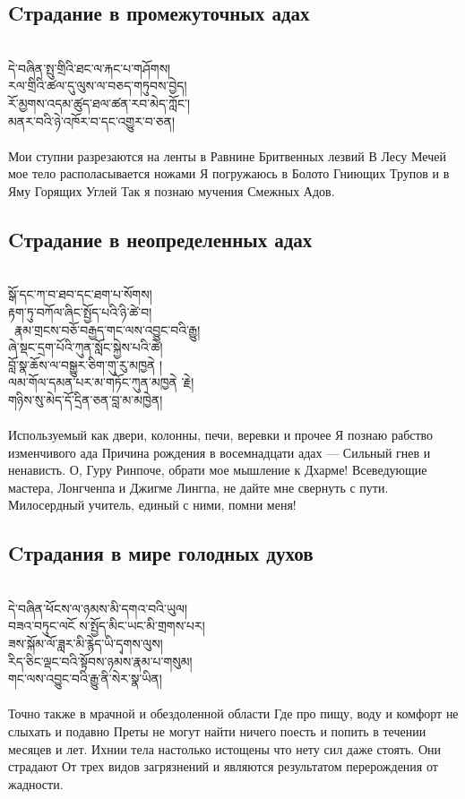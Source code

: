 \subsection*{Cтрадание в промежуточных адах}
\\
\ti
དེ་བཞིན་སྤུ་གྲིའི་ཐང་ལ་རྐང་པ་གཤོགས།\\
རལ་གྲིའི་ཚལ་དུ་ལུས་ལ་བཅད་གཏུབས་བྱེད།\\
རོ་མྱགས་འདམ་ཚུད་ཐལ་ཚན་རབ་མེད་ཀློང་། \\
མནར་བའི་ཉེ་འཁོར་བ་དང་འགྱུར་བ་ཅན།\\
\\
\ru
Мои ступни разрезаются на ленты в Равнине Бритвенных лезвий В Лесу Мечей мое тело располасывается ножами
Я погружаюсь в Болото Гниющих Трупов и в Яму Горящих Углей Так я познаю мучения Смежных Адов.

\subsection*{Cтрадание в неопределенных адах}
\\
\ti
སྒོ་དང་ཀ་བ་ཐབ་དང་ཐག་པ་སོགས།\\
རྟག་ཏུ་བཀོལ་ཞིང་སྤྱོད་པའི་ཉི་ཚེ་བ། \\\
རྣམ་གྲངས་བཅོ་བརྒྱད་གང་ལས་འབྱུང་བའི་རྒྱུ། \\
ཞེ་སྡང་དྲག་པོའི་ཀུན་སློང་སྐྱེས་པའི་ཚེ། \\
བློ་སྣ་ཆོས་ལ་བསྒྱུར་ཅིག་གུ་རུ་མཁྱནེ ། \\
ལམ་གོལ་དམན་པར་མ་གཏོང་ཀུན་མཁྱནེ ་རྗེ། \\
གཉིས་སུ་མེད་དོ་དྲིན་ཅན་བླ་མ་མཁྱེན།\\
\\
\ru
Используемый как двери, колонны, печи, веревки и прочее Я познаю рабство изменчивого ада
Причина рождения в восемнадцати адах —
Сильный гнев и ненависть.
О, Гуру Ринпоче, обрати мое мышление к Дхарме!
Всеведующие мастера, Лонгченпа и Джигме Лингпа,
не дайте мне свернуть с пути. Милосердный учитель, единый с ними, помни меня!
\\

\newpage
\subsection*{Cтрадания в мире голодных духов}
\\
\ti
དེ་བཞིན་ཕོངས་ལ་ཉམས་མི་དགའ་བའི་ཡུལ།\\
བཟའ་བཏུང་ལངོ ས་སྤྱོད་མིང་ཡང་མི་གྲགས་པར། \\
ཟས་སྐོམ་ལོ་ཟླར་མི་རྙེད་ཡི་དྭགས་ལུས། \\
རིད་ཅིང་ལྡང་བའི་སྟོབས་ཉམས་རྣམ་པ་གསུམ། \\
གང་ལས་འབྱུང་བའི་རྒྱུ་ནི་སེར་སྣ་ཡིན།\\
\\
\ru
Точно также в мрачной и обездоленной области
Где про пищу, воду и комфорт не слыхать и подавно
Преты не могут найти ничего поесть и попить в течении месяцев и лет.
Ихнии тела настолько истощены что нету сил даже стоять. Они страдают
От трех видов загрязнений и являются результатом перерождения от жадности.

